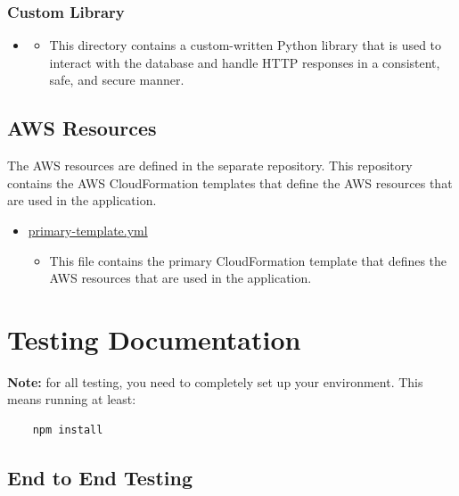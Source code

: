 \documentclass[12pt]{article}
\begin{document}
\subsubsection{Custom Library}
\begin{itemize}
    \item \href{https://github.com/AboutMyHT/angular-app/tree/main/aboutmyhometown-lambda-stack/dependencies/python/amht_custom}{}
          \begin{itemize}
              \item This directory contains a custom-written Python library that is used to interact with the database and handle HTTP responses in a consistent, safe, and secure manner.
          \end{itemize}
\end{itemize}

\subsection{AWS Resources}

The AWS resources are defined in the separate \href{https://github.com/AboutMyHT/aws-resources}{} repository. This repository contains the AWS CloudFormation templates that define the AWS resources that are used in the application.
\begin{itemize}
    \item \href{https://github.com/AboutMyHT/aws-resources/blob/main/primary-template.yml}{primary-template.yml}
          \begin{itemize}
              \item This file contains the primary CloudFormation template that defines the AWS resources that are used in the application.
          \end{itemize}
\end{itemize}

\newpage

\section{Testing Documentation}

\textbf{Note:} for all testing, you need to completely set up your environment. This means running at least:
\begin{verbatim}
    npm install
\end{verbatim}

\subsection{End to End Testing}
\end{document}
